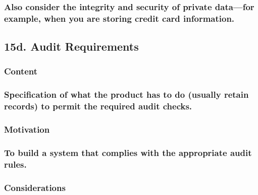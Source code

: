 \documentclass[
]{article}
\begin{document}
\hypertarget{also-consider-the-integrity-and-security-of-private-datafor-example-when-you-are-storing-credit-card-information.}{%
\subsubsection{\texorpdfstring{Also consider the integrity and security
of private data---for example, when you are storing credit card
information.
}{Also consider the integrity and security of private data---for example, when you are storing credit card information. }}\label{also-consider-the-integrity-and-security-of-private-datafor-example-when-you-are-storing-credit-card-information.}}

\hypertarget{d.-audit-requirements}{%
\subsection{15d. Audit Requirements}\label{d.-audit-requirements}}

\hypertarget{content-55}{%
\subsubsection{Content}\label{content-55}}

\hypertarget{specification-of-what-the-product-has-to-do-usually-retain-records-to-permit-the-required-audit-checks.}{%
\subsubsection{Specification of what the product has to do (usually
retain records) to permit the required audit
checks.}\label{specification-of-what-the-product-has-to-do-usually-retain-records-to-permit-the-required-audit-checks.}}

\hypertarget{motivation-54}{%
\subsubsection{Motivation}\label{motivation-54}}

\hypertarget{to-build-a-system-that-complies-with-the-appropriate-audit-rules.}{%
\subsubsection{To build a system that complies with the appropriate
audit
rules.}\label{to-build-a-system-that-complies-with-the-appropriate-audit-rules.}}

\hypertarget{considerations-39}{%
\subsubsection{Considerations}\label{considerations-39}}
\end{document}
